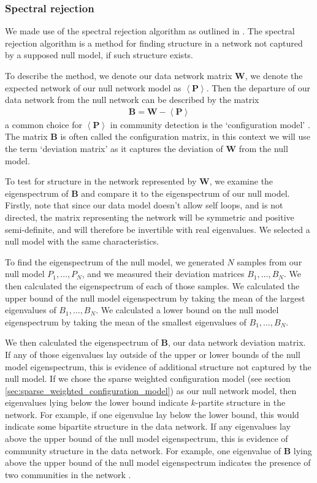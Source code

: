 \documentclass[a4paper,12pt]{article}
\theoremstyle{definition}
\begin{document}
        \subsubsection{Spectral rejection}\label{sec:spectral_rejection}
        We made use of the spectral rejection algorithm as outlined in \cite{humphries}. The spectral rejection algorithm is a method for finding structure in a network not captured by a supposed null model, if such structure exists.

        To describe the method, we denote our data network matrix $\mathbf{W}$, we denote the expected network of our null network model as $\left\langle \mathbf{P} \right\rangle$. Then the departure of our data network from the null network can be described by the matrix
        \begin{align}
          \mathbf{B} = \mathbf{W} - \left\langle \mathbf{P} \right\rangle
        \end{align}
        a common choice for $\left\langle \mathbf{P} \right\rangle$ in community detection is the `configuration model' \cite{fosdick, humphries2}. The matrix $\mathbf{B}$ is often called the configuration matrix, in this context we will use the term `deviation matrix' as it captures the deviation of $\mathbf{W}$ from the null model.

        To test for structure in the network represented by $\mathbf{W}$, we examine the eigenspectrum of $\mathbf{B}$ and compare it to the eigenspectrum of our null model. Firstly, note that since our data model doesn't allow self loops, and is not directed, the matrix representing the network will be symmetric and positive semi-definite, and will therefore be invertible with real eigenvalues. We selected a null model with the same characteristics.

        To find the eigenspectrum of the null model, we generated $N$ samples from our null model $P_1, \dots, P_N$, and we measured their deviation matrices $B_1, \dots, B_N$. We then calculated the eigenspectrum of each of those samples. We calculated the upper bound of the null model eigenspectrum by taking the mean of the largest eigenvalues of $B_1, \dots, B_N$. We calculated a lower bound on the null model eigenspectrum by taking the mean of the smallest eigenvalues of $B_1, \dots, B_N$.

        We then calculated the eigenspectrum of $\mathbf{B}$, our data network deviation matrix. If any of those eigenvalues lay outside of the upper or lower bounds of the null model eigenspectrum, this is evidence of additional structure not captured by the null model. If we chose the sparse weighted configuration model (see section \ref{sec:sparse_weighted_configuration_model}) as our null network model, then eigenvalues lying below the lower bound indicate $k$-partite structure in the network. For example, if one eigenvalue lay below the lower bound, this would indicate some bipartite structure in the data network. If any eigenvalues lay above the upper bound of the null model eigenspectrum, this is evidence of community structure in the data network. For example, one eigenvalue of $\mathbf{B}$ lying above the upper bound of the null model eigenspectrum indicates the presence of two communities in the network \cite{humphries2}.
\end{document}
